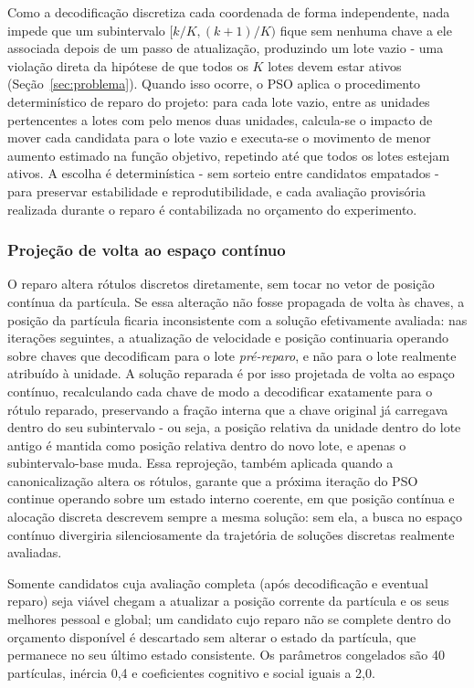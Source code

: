 \documentclass[12pt,a4paper]{article}
\begin{document}
Como a decodificação discretiza cada coordenada de forma independente, nada
impede que um subintervalo $[k/K, (k+1)/K)$ fique sem nenhuma chave a ele
associada depois de um passo de atualização, produzindo um lote vazio -
uma violação direta da hipótese de que todos os $K$ lotes devem estar ativos
(Seção~\ref{sec:problema}). Quando isso ocorre, o PSO aplica o procedimento determinístico de reparo do projeto: para cada lote
vazio, entre as unidades pertencentes a lotes com pelo menos duas unidades,
calcula-se o impacto de mover cada candidata para o lote vazio e executa-se
o movimento de menor aumento estimado na função objetivo, repetindo até que
todos os lotes estejam ativos. A escolha é determinística - sem sorteio
entre candidatos empatados - para preservar estabilidade e
reprodutibilidade, e cada avaliação provisória realizada durante o reparo é
contabilizada no orçamento do experimento.

\subsubsection*{Projeção de volta ao espaço contínuo}

O reparo altera rótulos discretos diretamente, sem tocar no vetor de
posição contínua da partícula. Se essa alteração não fosse propagada de
volta às chaves, a posição da partícula ficaria inconsistente com a solução
efetivamente avaliada: nas iterações seguintes, a atualização de velocidade
e posição continuaria operando sobre chaves que decodificam para o lote
\emph{pré-reparo}, e não para o lote realmente atribuído à unidade. A
solução reparada é por isso projetada de volta ao espaço contínuo,
recalculando cada chave de modo a decodificar exatamente para o rótulo
reparado, preservando a fração interna que a chave original já carregava
dentro do seu subintervalo - ou seja, a posição relativa da unidade dentro
do lote antigo é mantida como posição relativa dentro do novo lote, e apenas
o subintervalo-base muda. Essa reprojeção, também aplicada quando a canonicalização altera os rótulos, garante que a próxima
iteração do PSO continue operando sobre um estado interno coerente, em que
posição contínua e alocação discreta descrevem sempre a mesma solução:
sem ela, a busca no espaço contínuo divergiria silenciosamente da
trajetória de soluções discretas realmente avaliadas.

Somente candidatos cuja avaliação completa (após decodificação e eventual
reparo) seja viável chegam a atualizar a posição corrente da partícula e os
seus melhores pessoal e global; um candidato cujo reparo não se complete
dentro do orçamento disponível é descartado sem alterar o estado da
partícula, que permanece no seu último estado consistente. Os parâmetros congelados são 40 partículas, inércia 0,4 e coeficientes
cognitivo e social iguais a 2,0.
\end{document}
